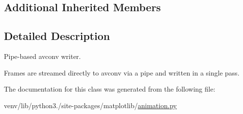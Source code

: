 \subsection*{Additional Inherited Members}


\subsection{Detailed Description}
\begin{DoxyVerb}Pipe-based avconv writer.

Frames are streamed directly to avconv via a pipe and written in a single
pass.
\end{DoxyVerb}
 

The documentation for this class was generated from the following file\+:\begin{DoxyCompactItemize}
\item 
venv/lib/python3./site-\/packages/matplotlib/\hyperlink{animation_8py}{animation.\+py}\end{DoxyCompactItemize}
